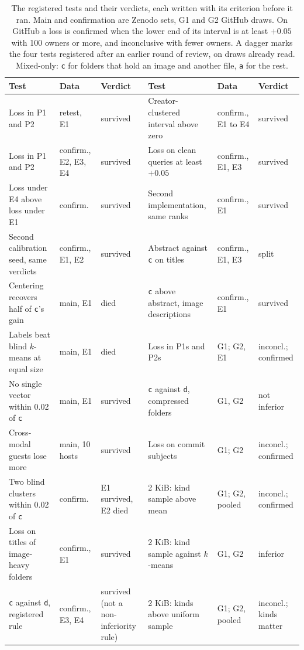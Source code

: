 \documentclass[sigconf,natbib=true,anonymous=true]{acmart}
\newcommand{\rep}[1]{\texttt{#1}}
\begin{document}
\begin{table}[t]
\caption{The registered tests and their verdicts, each written with its criterion before it ran. Main and confirmation are Zenodo sets, G1 and G2 GitHub draws. On GitHub a loss is confirmed when the lower end of its interval is at least $+0.05$ with 100 owners or more, and inconclusive with fewer owners. A dagger marks the four tests registered after an earlier round of review, on draws already read. Mixed-only: \rep{c} for folders that hold an image and another file, \rep{a} for the rest.}
\label{tab:verdicts}
\footnotesize
\setlength{\tabcolsep}{3pt}
\begin{tabular}{lll|lll}
\toprule
Test & Data & Verdict & Test & Data & Verdict \\
\midrule
Loss in P1 and P2 & retest, E1 & survived & Creator-clustered interval above zero & confirm., E1 to E4 & survived \\
Loss in P1 and P2 & confirm., E2, E3, E4 & survived & Loss on clean queries at least $+0.05$ & confirm., E1, E3 & survived \\
Loss under E4 above loss under E1 & confirm. & survived & Second implementation, same ranks & confirm., E1 & survived \\
Second calibration seed, same verdicts & confirm., E1, E2 & survived & Abstract against \rep{c} on titles & confirm., E1, E3 & split \\
Centering recovers half of \rep{c}'s gain & main, E1 & died & \rep{c} above abstract, image descriptions & confirm., E1 & survived \\
Labels beat blind $k$-means at equal size & main, E1 & died & Loss in P1s and P2s & G1; G2, E1 & inconcl.; confirmed \\
No single vector within 0.02 of \rep{c} & main, E1 & survived & \rep{c} against \rep{d}, compressed folders & G1, G2 & not inferior \\
Cross-modal guests lose more & main, 10 hosts & survived & Loss on commit subjects & G1; G2 & inconcl.; confirmed \\
Two blind clusters within 0.02 of \rep{c} & confirm. & E1 survived, E2 died & 2 KiB: kind sample above mean & G1; G2, pooled & inconcl.; confirmed \\
Loss on titles of image-heavy folders & confirm., E1 & survived & 2 KiB: kind sample against $k$-means & G1, G2 & inferior \\
\rep{c} against \rep{d}, registered rule & confirm., E3, E4 & survived (not a non-inferiority rule) & 2 KiB: kinds above uniform sample & G1; G2, pooled & inconcl.; kinds matter \\

\end{tabular}
\end{table}
\end{document}
